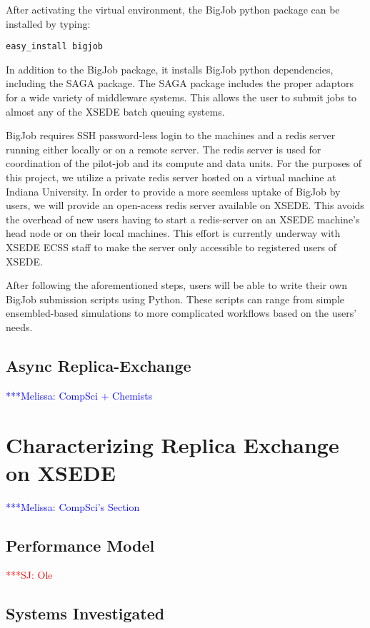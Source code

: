 \documentclass{sig-alternate}
\newcommand{\jhanote}[1]{ {\textcolor{red} { ***SJ: #1 }}}
\newcommand{\mrnote}[1]{ {\textcolor{blue} { ***Melissa: #1 }}}
\newcommand{\jhanote}[1]{}
\begin{document}
After activating the virtual environment, the BigJob python package can be installed
by typing: 

\begin{lstlisting}[frame=single]
easy_install bigjob
\end{lstlisting}

In addition to the BigJob package, it installs BigJob python
dependencies, including the SAGA package. The SAGA package includes the proper
adaptors for a wide variety of middleware systems. This allows
the user to submit jobs to almost any of the XSEDE batch queuing systems.

BigJob requires SSH password-less login to the machines and a redis server running either locally or on a remote server. The redis server is used for coordination
of the pilot-job and its compute and data units. For the purposes of this project, we utilize a private redis server hosted on a virtual machine at Indiana University. In order to provide a more seemless uptake of BigJob by users, we will provide an open-acess redis server available on XSEDE. This avoids the overhead of new users having to start a redis-server on an XSEDE machine's head node or on their local machines. This effort is currently underway with XSEDE ECSS staff to make the server only accessible to registered users of XSEDE.

After following the aforementioned steps, users will be able to write their own BigJob submission scripts using Python. These scripts can range from simple ensembled-based simulations to more complicated workflows based on the users' needs.

\subsection{Async Replica-Exchange}
\mrnote{CompSci + Chemists}

\section{Characterizing Replica Exchange on XSEDE }\label{sec:results}
\mrnote{ CompSci's Section}

\subsection{Performance Model}

\jhanote{Ole}

\subsection{Systems Investigated} 
\end{document}
